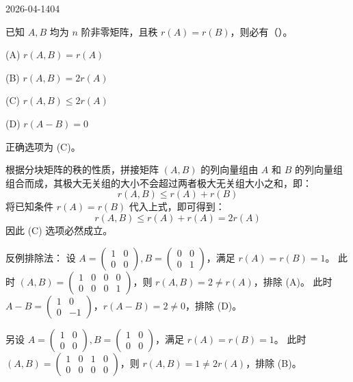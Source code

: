 \begin{mistake}{2026-04-14}{04}

\begin{problemcontent}
已知 \(A,B\) 均为 \(n\) 阶非零矩阵，且秩 \(r(A) = r(B)\)，则必有（\quad）。

(A) \(r(A, B) = r(A)\) 

(B) \(r(A, B) = 2r(A)\)

(C) \(r(A, B) \leqslant 2r(A)\) 

(D) \(r(A - B) = 0\)
\end{problemcontent}

\begin{solutioncontent}
正确选项为 (C)。

根据分块矩阵的秩的性质，拼接矩阵 \((A, B)\) 的列向量组由 \(A\) 和 \(B\) 的列向量组组合而成，其极大无关组的大小不会超过两者极大无关组大小之和，即：
\[ r(A, B) \leqslant r(A) + r(B) \]
将已知条件 \(r(A) = r(B)\) 代入上式，即可得到：
\[ r(A, B) \leqslant r(A) + r(A) = 2r(A) \]
因此 (C) 选项必然成立。

反例排除法：
设 \(A = \begin{pmatrix} 1 & 0 \\ 0 & 0 \end{pmatrix}, B = \begin{pmatrix} 0 & 0 \\ 0 & 1 \end{pmatrix}\)，满足 \(r(A)=r(B)=1\)。
此时 \((A, B) = \begin{pmatrix} 1 & 0 & 0 & 0 \\ 0 & 0 & 0 & 1 \end{pmatrix}\)，则 \(r(A, B) = 2 \neq r(A)\)，排除 (A)。
此时 \(A - B = \begin{pmatrix} 1 & 0 \\ 0 & -1 \end{pmatrix}\)，\(r(A-B) = 2 \neq 0\)，排除 (D)。

另设 \(A = \begin{pmatrix} 1 & 0 \\ 0 & 0 \end{pmatrix}, B = \begin{pmatrix} 1 & 0 \\ 0 & 0 \end{pmatrix}\)，满足 \(r(A)=r(B)=1\)。
此时 \((A, B) = \begin{pmatrix} 1 & 0 & 1 & 0 \\ 0 & 0 & 0 & 0 \end{pmatrix}\)，则 \(r(A, B) = 1 \neq 2r(A)\)，排除 (B)。
\end{solutioncontent}


\end{mistake}
